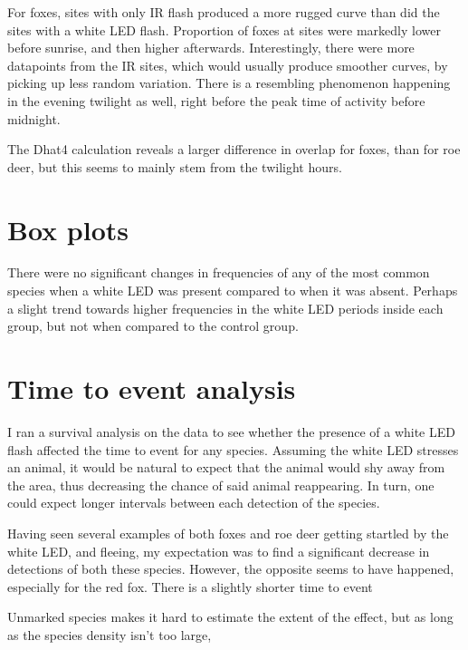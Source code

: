 For foxes, sites with only IR flash produced a more rugged curve than did the sites with a white LED flash.
Proportion of foxes at sites were markedly lower before sunrise, and then higher afterwards. 
Interestingly, there were more datapoints from the IR sites, which would usually produce smoother curves, by picking up less random variation. 
There is a resembling phenomenon happening in the evening twilight as well, right before the peak time of activity before midnight.

The Dhat4 calculation reveals a larger difference in overlap for foxes, than for roe deer, but this seems to mainly stem from the twilight hours.


\section{Box plots}


There were no significant changes in frequencies of any of the most common species when a white LED was present compared to when it was absent. Perhaps a slight trend towards higher frequencies in the white LED periods inside each group, but not when compared to the control group.


\section{Time to event analysis}

I ran a survival analysis on the data to see whether the presence of a white LED flash affected the time to event for any species.
Assuming the white LED stresses an animal, it would be natural to expect that the animal would shy away from the area, thus decreasing the chance of said animal reappearing.
In turn, one could expect longer intervals between each detection of the species.

Having seen several examples of both foxes and roe deer getting startled by the white LED, and fleeing, my expectation was to find a significant decrease in detections of both these species.
However, the opposite seems to have happened, especially for the red fox. There is a slightly shorter time to event


Unmarked species makes it hard to estimate the extent of the effect, but as long as the species density isn't too large, 



